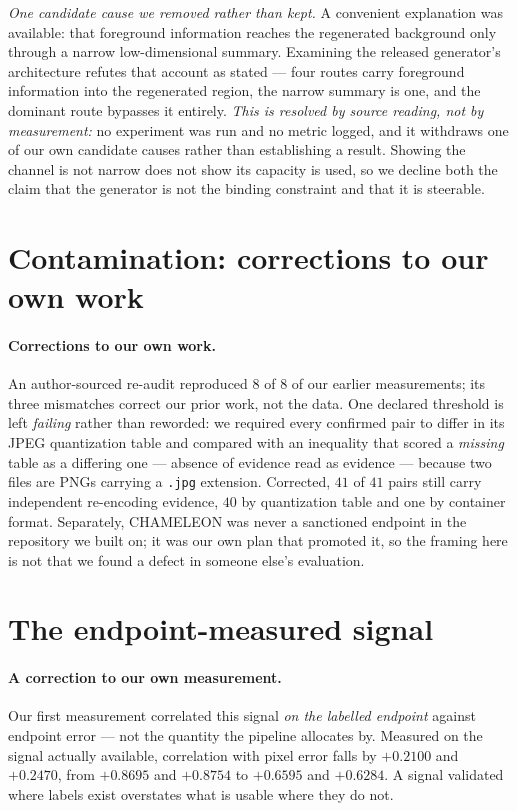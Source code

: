 \documentclass{article} %
\begin{document}
\emph{One candidate cause we removed rather than kept.} A convenient explanation was available: that
foreground information reaches the regenerated background only through a narrow low-dimensional
summary. Examining the released generator's architecture refutes that account as stated --- four routes
carry foreground information into the regenerated region, the narrow summary is one, and the dominant
route bypasses it entirely. \emph{This is resolved by source reading, not by measurement:} no
experiment was run and no metric logged, and it withdraws one of our own candidate causes rather than
establishing a result. Showing the channel is not narrow does not show its capacity is used, so we
decline both the claim that the generator is not the binding constraint and that it is steerable.



\section{Contamination: corrections to our own work}

\paragraph{Corrections to our own work.} An author-sourced re-audit reproduced $8$ of $8$ of our
earlier measurements; its three mismatches correct our prior work, not the data. One declared
threshold is left \emph{failing} rather than reworded: we required every confirmed pair to differ in
its JPEG quantization table and compared with an inequality that scored a \emph{missing} table as a
differing one --- absence of evidence read as evidence --- because two files are PNGs carrying a
\texttt{.jpg} extension. Corrected, $41$ of $41$ pairs still carry independent re-encoding evidence,
$40$ by quantization table and one by container format. Separately, CHAMELEON was never a sanctioned
endpoint in the repository we built on; it was our own plan that promoted it, so the framing here is
not that we found a defect in someone else's evaluation.


\section{The endpoint-measured signal}

\paragraph{A correction to our own measurement.} Our first measurement correlated this signal \emph{on
the labelled endpoint} against endpoint error --- not the quantity the pipeline allocates by. Measured
on the signal actually available, correlation with pixel error falls by $+0.2100$ and $+0.2470$, from
$+0.8695$ and $+0.8754$ to $+0.6595$ and $+0.6284$. A signal validated where labels exist overstates
what is usable where they do not.
\end{document}
